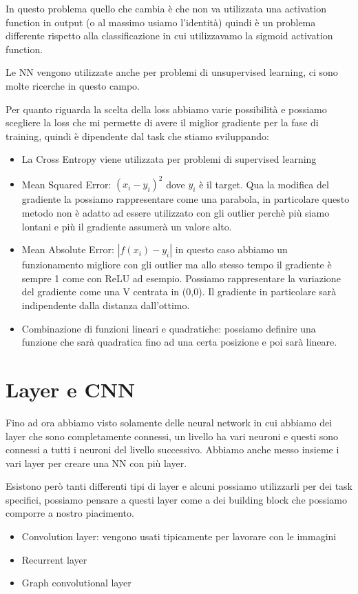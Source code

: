 \documentclass[14pt]{extreport}
\begin{document}
In questo problema quello che cambia è che non va utilizzata una activation function in output (o al massimo usiamo l'identità) quindi è un problema
differente rispetto alla classificazione in cui utilizzavamo la sigmoid activation function.

Le NN vengono utilizzate anche per problemi di unsupervised learning, ci sono molte ricerche in questo campo.

Per quanto riguarda la scelta della loss abbiamo varie possibilità e possiamo scegliere la loss che mi permette di avere il miglior gradiente per la
fase di training, quindi è dipendente dal task che stiamo sviluppando:

\begin{itemize}
	\item La Cross Entropy viene utilizzata per problemi di supervised learning
	\item Mean Squared Error: $(x_i-y_i)^2$ dove $y_i$ è il target. Qua la modifica del gradiente la possiamo rappresentare come una parabola, in
	      particolare questo metodo non è adatto ad essere utilizzato con gli outlier perchè più siamo lontani e più il gradiente assumerà un valore
	      alto.
	\item Mean Absolute Error: $|f(x_i)-y_i|$ in questo caso abbiamo un funzionamento migliore con gli outlier ma allo stesso tempo il gradiente è
	      sempre 1 come con ReLU ad esempio. Possiamo rappresentare la variazione del gradiente come una V centrata in (0,0). Il gradiente in
	      particolare sarà indipendente dalla distanza dall'ottimo.
	\item Combinazione di funzioni lineari e quadratiche: possiamo definire una funzione che sarà quadratica fino ad una certa posizione e poi sarà
	lineare.
\end{itemize}


\section{Layer e CNN}

Fino ad ora abbiamo visto solamente delle neural network in cui abbiamo dei layer che sono completamente connessi, un livello ha vari neuroni e questi
sono connessi a tutti i neuroni del livello successivo. Abbiamo anche messo insieme i vari layer per creare una NN con più layer.

Esistono però tanti differenti tipi di layer e alcuni possiamo utilizzarli per dei task specifici, possiamo pensare a questi layer come a dei building
block che possiamo comporre a nostro piacimento.
\begin{itemize}
	\item Convolution layer: vengono usati tipicamente per lavorare con le immagini
	\item Recurrent layer
	\item Graph convolutional layer
\end{itemize}
\end{document}
